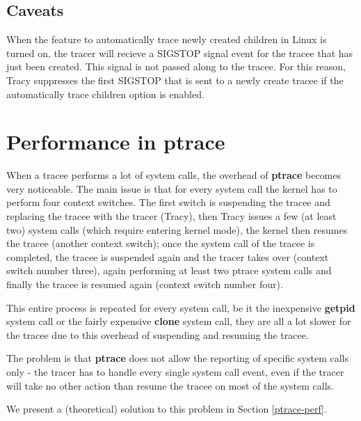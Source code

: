 \documentclass[a4paper, 10pt]{report}
\begin{document}



\subsection{Caveats}

When the feature to automatically trace newly created children in Linux
is turned on, the tracer will recieve a SIGSTOP signal event for the tracee
that has just been created. This signal is not passed along to the tracee.
For this reason, Tracy suppresses the first SIGSTOP that is sent
to a newly create tracee if the automatically trace children option
is enabled.

\section{Performance in ptrace}
\label{ptrace-perf-problems}

When a tracee performs a lot of system calls, the overhead of \textbf{ptrace}
becomes very noticeable. The main issue is that for every system call the kernel
has to perform four context switches. The first switch is suspending the tracee
and replacing the tracee with the tracer (Tracy), then Tracy issues a few
(at least two) system calls (which require entering kernel mode),
the kernel then resumes the tracee (another context switch); once the system
call of the tracee is completed, the tracee is suspended again and the tracer
takes over (context switch number three), again performing at least two ptrace
system calls and finally the tracee is resumed again (context switch number four).

This entire process is repeated for every system call, be it the
inexpensive \textbf{getpid} system call or the fairly expensive
\textbf{clone} system call, they are all a lot slower for the tracee
due to this overhead of suspending and resuming the tracee.

The problem is that \textbf{ptrace} does not allow the reporting of specific
system calls only - the tracer has to handle every single system call event,
even if the tracer will take no other action than resume the tracee on most
of the system calls.

We present a (theoretical) solution to this problem in
Section \ref{ptrace-perf}.
\end{document}
